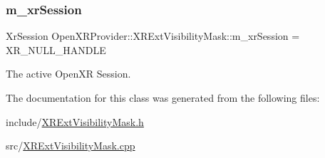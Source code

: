 \mbox{\label{class_open_x_r_provider_1_1_x_r_ext_visibility_mask_a9329d2062215a848d8b9e937036d1ee3}} 
\subsubsection{\texorpdfstring{m\_xrSession}{m\_xrSession}}
{\footnotesize\ttfamily Xr\+Session Open\+X\+R\+Provider\+::\+X\+R\+Ext\+Visibility\+Mask\+::m\+\_\+xr\+Session = X\+R\+\_\+\+N\+U\+L\+L\+\_\+\+H\+A\+N\+D\+LE}



The active Open\+XR Session. 



The documentation for this class was generated from the following files\+:\begin{DoxyCompactItemize}
\item 
include/\mbox{\hyperlink{_x_r_ext_visibility_mask_8h}{X\+R\+Ext\+Visibility\+Mask.\+h}}\item 
src/\mbox{\hyperlink{_x_r_ext_visibility_mask_8cpp}{X\+R\+Ext\+Visibility\+Mask.\+cpp}}\end{DoxyCompactItemize}
